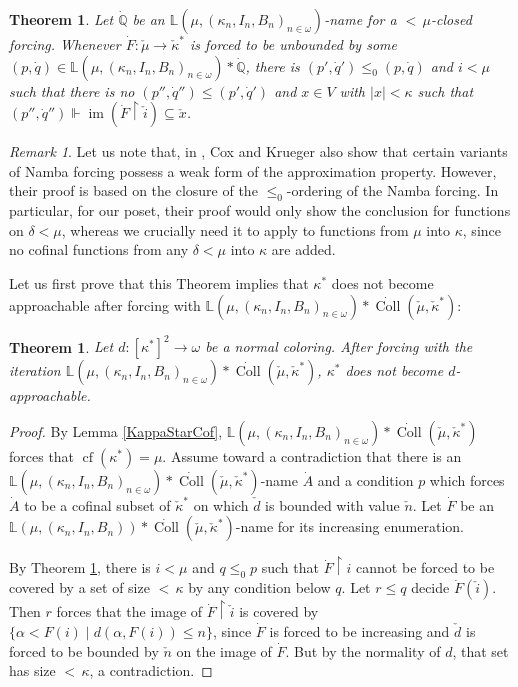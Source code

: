 \documentclass[a4paper]{amsart}
\theoremstyle{definition}
\theoremstyle{remark}
\newtheorem{mybem}[mydef]{Remark}
\theoremstyle{plain}
\newtheorem{mysen}[mydef]{Theorem}
\numberwithin{mydef}{section}
\DeclareMathOperator{\im}{im}
\DeclareMathOperator{\cf}{cf}
\DeclareMathOperator{\Coll}{Coll}
\newcommand{\dL}{\mathbb{L}}
\newcommand{\dQ}{\mathbb{Q}}
\newcommand{\uhr}{\upharpoonright}
\begin{document}
	\begin{mysen}\label{BetterApproxProp}
		Let $\dot{\dQ}$ be an $\dL(\mu,(\kappa_n,I_n,B_n)_{n\in\omega})$-name for a ${<}\,\mu$-closed forcing. Whenever $\dot{F}\colon\check{\mu}\to\check{\kappa}^*$ is forced to be unbounded by some $(p,\dot{q})\in\dL(\mu,(\kappa_n,I_n,B_n)_{n\in\omega})*\dot{\dQ}$, there is $(p',\dot{q}')\leq_0(p,\dot{q})$ and $i<\mu$ such that there is no $(p'',\dot{q}'')\leq(p',\dot{q}')$ and $x\in V$ with $|x|<\kappa$ such that $(p'',\dot{q}'')\Vdash\im(\dot{F}\uhr\check{i})\subseteq\check{x}$.
	\end{mysen}
	
	\begin{mybem}
		Let us note that, in \cite[Theorem 3]{CoxKruegerNamba}, Cox and Krueger also show that certain variants of Namba forcing possess a weak form of the approximation property. However, their proof is based on the closure of the $\leq_0$-ordering of the Namba forcing. In particular, for our poset, their proof would only show the conclusion for functions on $\delta<\mu$, whereas we crucially need it to apply to functions from $\mu$ into $\kappa$, since no cofinal functions from any $\delta<\mu$ into $\kappa$ are added.
	\end{mybem}
	
	Let us first prove that this Theorem implies that $\kappa^*$ does not become approachable after forcing with $\dL(\mu,(\kappa_n,I_n,B_n)_{n\in\omega})*\dot{\Coll}(\check{\mu},\check{\kappa}^*)$:
	
	\begin{mysen}\label{NoNewApproach}
		Let $d\colon[\kappa^*]^2\to\omega$ be a normal coloring. After forcing with the iteration $\dL(\mu,(\kappa_n,I_n,B_n)_{n\in\omega})*\dot{\Coll}(\check{\mu},\check{\kappa}^*)$, $\kappa^*$ does not become $d$-approachable.
	\end{mysen}
	
	\begin{proof}
		By Lemma \ref{KappaStarCof},  $\dL(\mu,(\kappa_n,I_n,B_n)_{n\in\omega})*\dot{\Coll}(\check{\mu},\check{\kappa}^*)$ forces that $\cf(\kappa^*)=\mu$. Assume toward a contradiction that there is an $\dL(\mu,(\kappa_n,I_n,B_n)_{n\in\omega})*\dot{\Coll}(\check{\mu},\check{\kappa}^*)$-name $\dot{A}$ and a condition $p$ which forces $\dot{A}$ to be a cofinal subset of $\check{\kappa}^*$ on which $\check{d}$ is bounded with value $\check{n}$. Let $\dot{F}$ be an $\dL(\mu,(\kappa_n,I_n,B_n))*\dot{\Coll}(\check{\mu},\check{\kappa}^*)$-name for its increasing enumeration.
		
		By Theorem \ref{BetterApproxProp}, there is $i<\mu$ and $q\leq_0p$ such that $\dot{F}\uhr i$ cannot be forced to be covered by a set of size ${<}\,\kappa$ by any condition below $q$. Let $r\leq q$ decide $\dot{F}(\check{i})$. Then $r$ forces that the image of $\dot{F}\uhr\check{i}$ is covered by $\{\alpha<F(i)\;|\;d(\alpha,F(i))\leq n\}$, since $\dot{F}$ is forced to be increasing and $\check{d}$ is forced to be bounded by $\check{n}$ on the image of $\dot{F}$. But by the normality of $d$, that set has size ${<}\,\kappa$, a contradiction.
	\end{proof}
	
\end{document}
